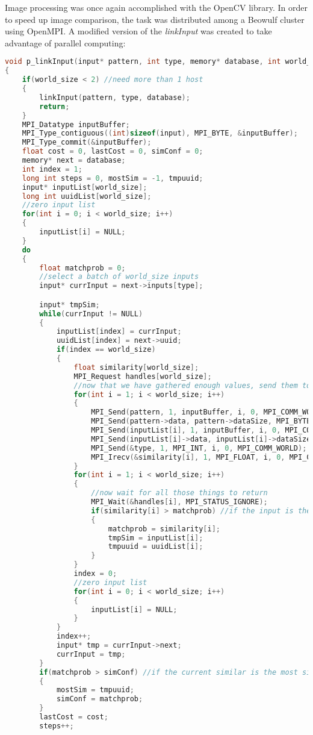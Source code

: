 \documentclass{report}
\begin{document}
Image processing was once again accomplished with the OpenCV library. In order to speed up image comparison, the task was distributed among a Beowulf cluster using OpenMPI. A modified version of the \textit{linkInput} was created to take advantage of parallel computing:
\lstset{style=ccode}
\begin{lstlisting}[language=C]
void p_linkInput(input* pattern, int type, memory* database, int world_size)
{
    if(world_size < 2) //need more than 1 host
    {
        linkInput(pattern, type, database);
        return;
    }
    MPI_Datatype inputBuffer;
    MPI_Type_contiguous((int)sizeof(input), MPI_BYTE, &inputBuffer);
    MPI_Type_commit(&inputBuffer);
    float cost = 0, lastCost = 0, simConf = 0;
    memory* next = database;
    int index = 1;
    long int steps = 0, mostSim = -1, tmpuuid;
    input* inputList[world_size];
    long int uuidList[world_size];
    //zero input list
    for(int i = 0; i < world_size; i++)
    {
        inputList[i] = NULL;
    }
    do
    {
        float matchprob = 0;
        //select a batch of world_size inputs
        input* currInput = next->inputs[type];

        input* tmpSim;
        while(currInput != NULL)
        {
            inputList[index] = currInput;
            uuidList[index] = next->uuid;
            if(index == world_size)
            {
                float similarity[world_size];
                MPI_Request handles[world_size];
                //now that we have gathered enough values, send them to nodes
                for(int i = 1; i < world_size; i++)
                {
                    MPI_Send(pattern, 1, inputBuffer, i, 0, MPI_COMM_WORLD);
                    MPI_Send(pattern->data, pattern->dataSize, MPI_BYTE, i, 0, MPI_COMM_WORLD);
                    MPI_Send(inputList[i], 1, inputBuffer, i, 0, MPI_COMM_WORLD);
                    MPI_Send(inputList[i]->data, inputList[i]->dataSize, MPI_BYTE, i, 0, MPI_COMM_WORLD);
                    MPI_Send(&type, 1, MPI_INT, i, 0, MPI_COMM_WORLD);
                    MPI_Irecv(&similarity[i], 1, MPI_FLOAT, i, 0, MPI_COMM_WORLD, &handles[i]);
                }
                for(int i = 1; i < world_size; i++)
                {
                    //now wait for all those things to return
                    MPI_Wait(&handles[i], MPI_STATUS_IGNORE);
                    if(similarity[i] > matchprob) //if the input is the most similar of all inputs in the memory so far, save it
                    {
                        matchprob = similarity[i];
                        tmpSim = inputList[i];
                        tmpuuid = uuidList[i];
                    }
                }
                index = 0;
                //zero input list
                for(int i = 0; i < world_size; i++)
                {
                    inputList[i] = NULL;
                }
            }
            index++;
            input* tmp = currInput->next;
            currInput = tmp;
        }
        if(matchprob > simConf) //if the current similar is the most similar so far, save it
        {
            mostSim = tmpuuid;
            simConf = matchprob;
        }
        lastCost = cost;
        steps++;


\end{lstlisting}
\end{document}
